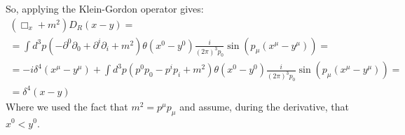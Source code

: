 \documentclass{article}
\begin{document}
So, applying the Klein-Gordon operator gives:
\begin{equation}
\begin{gathered}
    \left(\Box_x + m^2\right) D_R(x - y) =
    \\
    = \int d^3p \left(- \partial^0 \partial_0 + \partial^i \partial_i + m^2\right) \theta(x^0 - y^0) \frac{i}{(2\pi)^3 p_0}
    \sin\left(p_\mu \left(x^\mu - y^\mu\right)\right) = 
    \\
    = - i \delta^4(x^\mu - y^\mu) + \int d^3p \left(p^0p_0 - p^ip_i + m^2\right) \theta(x^0 - y^0) \frac{i}{(2\pi)^3 p_0}
    \sin\left(p_\mu \left(x^\mu - y^\mu\right)\right) = 
    \\
    = \delta^4(x - y)
\end{gathered}
\end{equation}
Where we used the fact that $m^2 = p^\mu p_\mu$ and assume, during the derivative, that $x^0 < y^0$.
\end{document}
